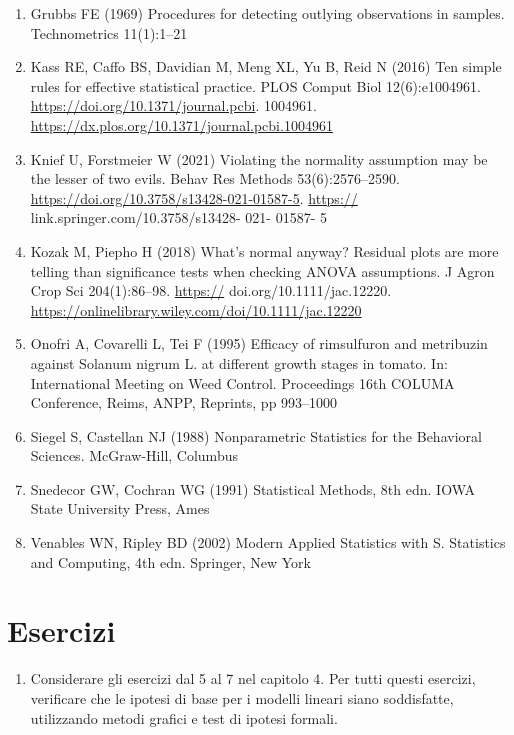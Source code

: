 \documentclass[
  12pt,
]{book}
\providecommand{\tightlist}{%
  \setlength{\itemsep}{0pt}\setlength{\parskip}{0pt}}
\begin{document}
\begin{enumerate}
\item
  Grubbs FE (1969) Procedures for detecting outlying observations in samples. Technometrics 11(1):1--21
\item
  Kass RE, Caffo BS, Davidian M, Meng XL, Yu B, Reid N (2016) Ten simple rules for effective statistical practice. PLOS Comput Biol 12(6):e1004961. \url{https://doi.org/10.1371/journal.pcbi}. 1004961. \url{https://dx.plos.org/10.1371/journal.pcbi.1004961}
\item
  Knief U, Forstmeier W (2021) Violating the normality assumption may be the lesser of two evils. Behav Res Methods 53(6):2576--2590. \url{https://doi.org/10.3758/s13428-021-01587-5}. \url{https://} link.springer.com/10.3758/s13428- 021- 01587- 5
\item
  Kozak M, Piepho H (2018) What's normal anyway? Residual plots are more telling than significance tests when checking ANOVA assumptions. J Agron Crop Sci 204(1):86--98. \url{https://} doi.org/10.1111/jac.12220. \url{https://onlinelibrary.wiley.com/doi/10.1111/jac.12220}
\item
  Onofri A, Covarelli L, Tei F (1995) Efficacy of rimsulfuron and metribuzin against Solanum nigrum L. at different growth stages in tomato. In: International Meeting on Weed Control. Proceedings 16th COLUMA Conference, Reims, ANPP, Reprints, pp 993--1000
\item
  Siegel S, Castellan NJ (1988) Nonparametric Statistics for the Behavioral Sciences. McGraw-Hill, Columbus
\item
  Snedecor GW, Cochran WG (1991) Statistical Methods, 8th edn. IOWA State University Press, Ames
\item
  Venables WN, Ripley BD (2002) Modern Applied Statistics with S. Statistics and Computing, 4th edn. Springer, New York
\end{enumerate}

\hypertarget{esercizi-1}{%
\section{Esercizi}\label{esercizi-1}}

\begin{enumerate}
\def\labelenumi{\arabic{enumi}.}
\tightlist
\item
  Considerare gli esercizi dal 5 al 7 nel capitolo 4. Per tutti questi esercizi, verificare che le ipotesi di base per i modelli lineari siano soddisfatte, utilizzando metodi grafici e test di ipotesi formali.
\end{enumerate}
\end{document}
